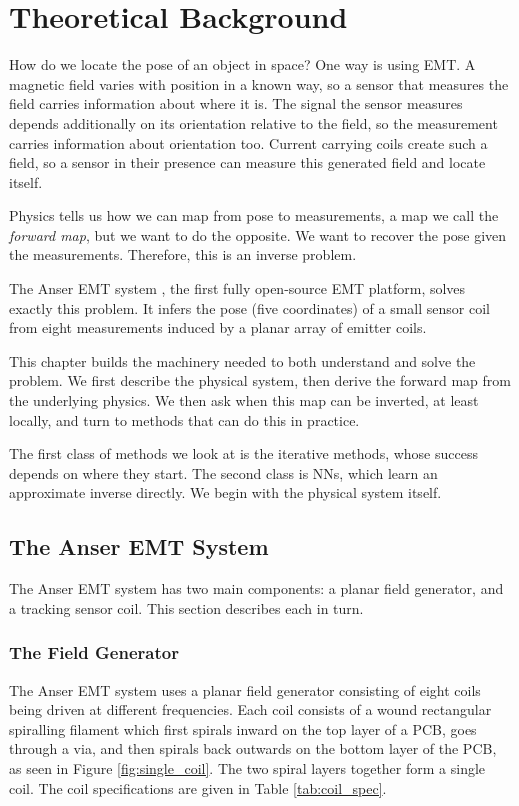 \chapter{Theoretical Background}\label{chap:background}

How do we locate the pose of an object in space? One way is using EMT. A magnetic field varies with position in a known way, so a sensor that measures the field carries information about where it is. The signal the sensor measures depends additionally on its orientation relative to the field, so the measurement carries information about orientation too. Current carrying coils create such a field, so a sensor in their presence can measure this generated field and locate itself.

Physics tells us how we can map from pose to measurements, a map we call the \emph{forward map}, but we want to do the opposite. We want to recover the pose given the measurements. Therefore, this is an inverse problem.

The Anser EMT system \cite{jaeger2017}, the first fully open-source EMT platform, solves exactly this problem. It infers the pose (five coordinates) of a small sensor coil from eight measurements induced by a planar array of emitter coils. 

This chapter builds the machinery needed to both understand and solve the problem. We first describe the physical system, then derive the forward map from the underlying physics. We then ask when this map can be inverted, at least locally, and turn to methods that can do this in practice.

The first class of methods we look at is the iterative methods, whose success depends on where they start. The second class is NNs, which learn an approximate inverse directly. We begin with the physical system itself.
\newpage
\section{The Anser EMT System}
The Anser EMT system has two main components: a planar field generator, and a tracking sensor coil. This section describes each in turn.

\subsection{The Field Generator}
The Anser EMT system uses a planar field generator consisting of eight coils being driven at different frequencies. Each coil consists of a wound rectangular spiralling filament which first spirals inward on the top layer of a PCB, goes through a via, and then spirals back outwards on the bottom layer of the PCB, as seen in Figure \ref{fig:single_coil}. The two spiral layers together form a single coil. The coil specifications are given in Table \ref{tab:coil_spec}.

